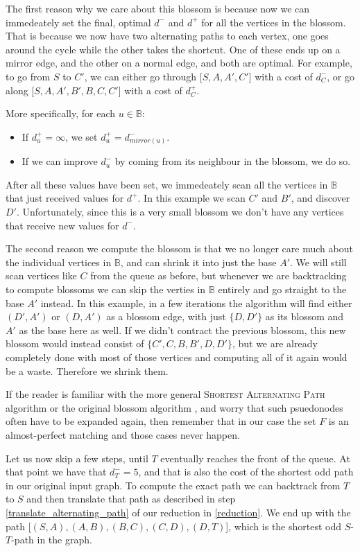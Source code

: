 The first reason why we care about this blossom is because now we can immedeately set the final, optimal $d^-$ and $d^+$ for all the vertices in the blossom. That is because we now have two alternating paths to each vertex, one goes around the cycle while the other takes the shortcut. One of these ends up on a mirror edge, and the other on a normal edge, and both are optimal. For example, to go from $S$ to $C'$, we can either go through [$S,A,A',C'$] with a cost of $d^-_C$, or go along [$S,A,A',B',B,C,C'$] with a cost of $d^+_C$.

More specifically, for each $u \in \mathbb{B}$: \begin{itemize}
    \item If $d^+_u = \infty$, we set $d^+_u = d^-_{mirror(u)}$.
    \item If we can improve $d^-_u$ by coming from its neighbour in the blossom, we do so.
\end{itemize}
After all these values have been set, we immedeately scan all the vertices in $\mathbb{B}$ that just received values for $d^+$. In this example we scan $C'$ and $B'$, and discover $D'$. Unfortunately, since this is a very small blossom we don't have any vertices that receive new values for $d^-$.



The second reason we compute the blossom is that we no longer care much about the individual vertices in $\mathbb{B}$, and can shrink it into just the base $A'$. We will still scan vertices like $C$ from the queue as before, but whenever we are backtracking to compute blossoms we can skip the verties in $\mathbb{B}$ entirely and go straight to the base $A'$ instead. In this example, in a few iterations the algorithm will find either $(D',A')$ or $(D,A')$ as a blossom edge, with just $\{D,D'\}$ as its blossom and $A'$ as the base here as well. If we didn't contract the previous blossom, this new blossom would instead consist of $\{C',C,B,B',D,D'\}$, but we are already completely done with most of those vertices and computing all of it again would be a waste. Therefore we shrink them. 

If the reader is familiar with the more general \textsc{Shortest Alternating Path} algorithm \cite{shortest_alternating_path} or the original blossom algorithm \cite{blossom}, and worry that such psuedonodes often have to be expanded again, then remember that in our case the set $F$ is an almost-perfect matching and those cases never happen. 



Let us now skip a few steps, until $T$ eventually reaches the front of the queue. At that point we have that $d^-_T = 5$, and that is also the cost of the shortest odd path in our original input graph. To compute the exact path we can backtrack from $T$ to $S$ and then translate that path as described in step \ref{translate_alternating_path} of our reduction in \ref{reduction}. We end up with the path [$(S,A),(A,B),(B,C),(C,D),(D,T)$], which is the shortest odd $S$-$T$-path in the graph.
